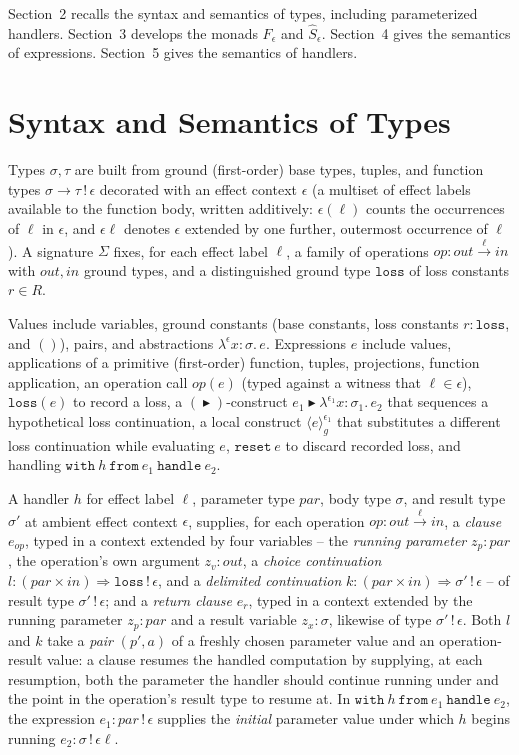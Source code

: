 \documentclass[11pt]{article}
\theoremstyle{plain}
\newcommand{\Fm}[1]{F_{#1}}
\newcommand{\Sm}[1]{\widehat{S}_{#1}}
\newcommand{\eps}{\epsilon}
\newcommand{\op}{\mathit{op}}
\newcommand{\then}{\mathrel{\blacktriangleright}}
\newcommand{\loc}[1]{\langle #1 \rangle} %
\begin{document}
Section~2 recalls the syntax and semantics of types, including parameterized handlers.
Section~3 develops the monads $\Fm\eps$ and $\Sm\eps$. Section~4 gives the semantics of
expressions. Section~5 gives the semantics of handlers.

\section{Syntax and Semantics of Types}

Types $\sigma,\tau$ are built from ground (first-order) base types, tuples, and function
types $\sigma\to\tau\,!\,\eps$ decorated with an effect context $\eps$ (a multiset of
effect labels available to the function body, written additively: $\eps(\ell)$ counts the
occurrences of $\ell$ in $\eps$, and $\eps\ell$ denotes $\eps$ extended by one further,
outermost occurrence of $\ell$). A signature $\Sigma$ fixes, for each effect label $\ell$, a
family of operations $\op:\mathit{out}\xrightarrow{\ell}\mathit{in}$ with
$\mathit{out},\mathit{in}$ ground types, and a distinguished ground type $\mathtt{loss}$ of
loss constants $r\in R$.

Values include variables, ground constants (base constants, loss constants $r:\mathtt{loss}$,
and $()$), pairs, and abstractions $\lambda^\eps x{:}\sigma.\,e$. Expressions $e$ include
values, applications of a primitive (first-order) function, tuples, projections, function
application, an operation call $\op(e)$ (typed against a witness that $\ell\in\eps$),
$\mathtt{loss}(e)$ to record a loss, a $(\then)$-construct $e_1\then\lambda^{\eps_1}
x{:}\sigma_1.\,e_2$ that sequences a hypothetical loss continuation, a local construct
$\loc{e}_g^{\eps_1}$ that substitutes a different loss continuation while evaluating $e$,
$\mathtt{reset}\ e$ to discard recorded loss, and handling
$\mathtt{with}\ h\ \mathtt{from}\ e_1\ \mathtt{handle}\ e_2$.

A handler $h$ for effect label $\ell$, parameter type $\mathit{par}$, body type $\sigma$,
and result type $\sigma'$ at ambient effect context $\eps$, supplies, for each operation
$\op:\mathit{out}\xrightarrow{\ell}\mathit{in}$, a \emph{clause} $e_\op$, typed in a context
extended by four variables -- the \emph{running parameter} $z_p{:}\mathit{par}$, the
operation's own argument $z_v{:}\mathit{out}$, a \emph{choice continuation}
$l:(\mathit{par}\times\mathit{in})\Rightarrow\mathtt{loss}\,!\,\eps$, and a \emph{delimited
continuation} $k:(\mathit{par}\times\mathit{in})\Rightarrow\sigma'\,!\,\eps$ -- of result
type $\sigma'\,!\,\eps$; and a \emph{return clause} $e_r$, typed in a context extended by
the running parameter $z_p{:}\mathit{par}$ and a result variable $z_x{:}\sigma$, likewise
of type $\sigma'\,!\,\eps$. Both $l$ and $k$ take a \emph{pair} $(p',a)$ of a freshly chosen
parameter value and an operation-result value: a clause resumes the handled computation by
supplying, at each resumption, both the parameter the handler should continue running
under and the point in the operation's result type to resume at. In
$\mathtt{with}\ h\ \mathtt{from}\ e_1\ \mathtt{handle}\ e_2$, the expression
$e_1:\mathit{par}\,!\,\eps$ supplies the \emph{initial} parameter value under which $h$
begins running $e_2:\sigma\,!\,\eps\ell$.
\end{document}
